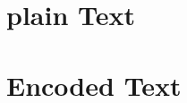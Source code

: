 \documentclass{article}
\begin{document}
\section{plain Text}
\lipsum[1]

\section{Encoded Text}
\fany
\lipsum[1]

\fancy
\lipsum[1]

\end{document}

